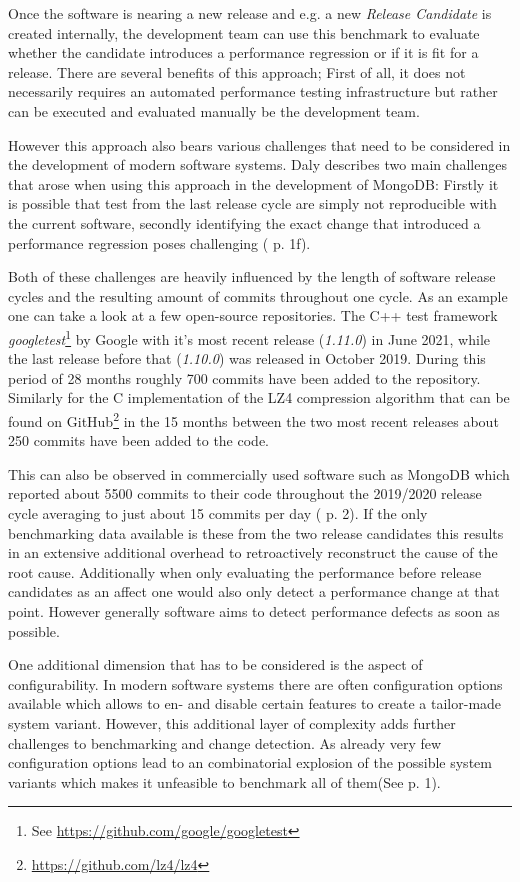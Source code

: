 \documentclass[	runningheads,
				a4paper]{llncs}
\begin{document}
	Once the software is nearing a new release and e.g. a new \textit{Release Candidate} is created internally, the development team can use this benchmark to evaluate whether the candidate introduces a performance regression or if it is fit for a release. There are several benefits of this approach; First of all, it does not necessarily requires an automated performance testing infrastructure but rather can be executed and evaluated manually be the development team. 

	However this approach also bears various challenges that need to be considered in the development of modern software systems. Daly describes two main challenges that arose when using this approach in the development of MongoDB: Firstly it is possible that test from the last release cycle are simply not reproducible with the current software, secondly identifying the exact change that introduced a performance regression poses challenging (\cite{daly2021} p. 1f).

	Both of these challenges are heavily influenced by the length of software release cycles and the resulting amount of commits throughout one cycle. As an example one can take a look at a few open-source repositories. The C++ test framework \textit{googletest}\footnote{See \url{https://github.com/google/googletest}} by Google with it's most recent release (\textit{1.11.0}) in June 2021, while the last release before that (\textit{1.10.0}) was released in October 2019. During this period of 28 months roughly 700 commits have been added to the repository. Similarly for the C implementation of the LZ4 compression algorithm that can be found on GitHub\footnote{\url{https://github.com/lz4/lz4}} in the 15 months between the two most recent releases about 250 commits have been added to the code.

	This can also be observed in commercially used software such as MongoDB which reported about 5500 commits to their code throughout the 2019/2020 release cycle averaging to just about 15 commits per day (\cite{daly2021} p. 2). If the only benchmarking data available is these from the two release candidates this results in an extensive additional overhead to retroactively reconstruct the cause of the root cause. Additionally when only evaluating the performance before release candidates as an affect one would also only detect a performance change at that point. However generally software aims to detect performance defects as soon as possible. 

	One additional dimension that has to be considered is the aspect of configurability. In modern software systems there are often configuration options available which allows to en- and disable certain features to create a tailor-made system variant. However, this additional layer of complexity adds further challenges to benchmarking and change detection. As already very few configuration options lead to an combinatorial explosion of the possible system variants which makes it unfeasible to benchmark all of them(See \cite{apel2020} p. 1).
\end{document}
